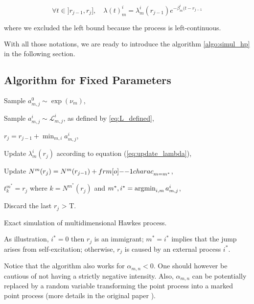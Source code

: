 \begin{equation}
\label{eq:update_lambda_plot} 
\forall t \in ]r_{j-1}, r_j ], \quad \lambda (t)_m^i = \lambda_m^i ( r_{j-1} )  e^{ - \beta_m^i ( t - r_{j-1} }
\end{equation} 

where we excluded the left bound because the process is left-continuous.
 
With all those notations, we are ready to introduce the algorithm \ref{algo:simul_hp} in the following section.









\subsection{Algorithm for Fixed Parameters}



\begin{algorithm}[H]
\label{algo:simul_hp}
\SetAlgoLined

			{ 
					{
						{Sample $a_{m,j}^0 \sim \exp( \nu_m ) $,
						
							{Sample $a_{m,j}^i \sim  \mathcal L^i_{m,j} $, as defined by \ref{eq:L_defined},
							}
						}
						
						$r_j = r_{j-1} + \min_{m,i} a_{m,j}^i$,
						
							{Update $\lambda_m^i ( r_j )$ according to equation (\ref{eq:update_lambda}),
							
							Update $N^m ( r_j ) = N^m( r_{j-1} ) + {\11charac}_{m = m^*} $,}
					$t_k^{m^*} = r_j$ where $k = N^{m^*} ( r_j ) $ and $ m^*,i^* = \operatorname*{\arg\!\min}_{i,m} a_{m,j}^i $,
					}
			Discard the last $r_j$ > T.
			}
\caption{Exact simulation of multidimensional Hawkes process.}
\end{algorithm}



\begin{remarque}
As illustration, $i^* = 0$ then $r_j$ is an immigrant; $m^* = i^*$ implies that the jump arises from self-excitation; otherwise, $r_j$ is caused by an external process $i^*$.
\end{remarque}

\begin{remarque}
Notice that the algorithm also works for $\alpha_{m,n} < 0$. One should however be cautious of not having a strictly negative intensity. Also, $\alpha_{m,n}$ can be potentially replaced by a random variable transforming the point process into a marked point process (more details in the original paper \cite{my_algo_simul}).
\end{remarque}

